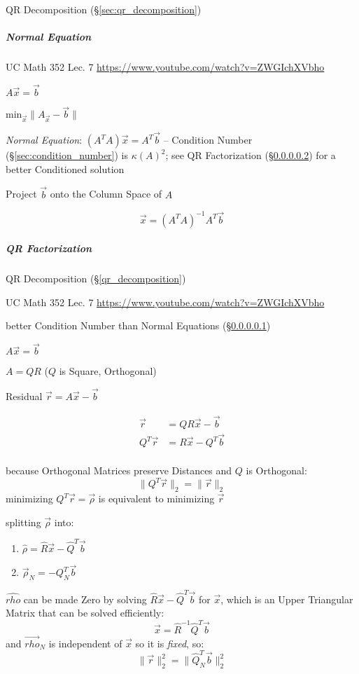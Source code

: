 QR Decomposition (\S\ref{sec:qr_decomposition})



\subparagraph{Normal Equation}\label{sec:normal_equation}\hfill

UC Math 352 Lec. 7 \url{https://www.youtube.com/watch?v=ZWGIchXVbho}

$A\vec{x} = \vec{b}$

$\mathrm{min}_\vec{x} \|A_\vec{x} - \vec{b}\|$

\emph{Normal Equation}: $(A^TA)\vec{x} = A^T\vec{b}$ -- Condition Number
(\S\ref{sec:condition_number}) is $\kappa(A)^2$; see QR Factorization
(\S\ref{sec:qr_factorization}) for a better Conditioned solution

Project $\vec{b}$ onto the Column Space of $A$

\[
  \vec{x} = (A^TA)^{-1}A^T\vec{b}
\]



\subparagraph{QR Factorization}\label{sec:qr_factorization}\hfill

QR Decomposition (\S\ref{qr_decomposition})

UC Math 352 Lec. 7 \url{https://www.youtube.com/watch?v=ZWGIchXVbho}

better Condition Number than Normal Equations (\S\ref{sec:normal_equation})

$A\vec{x} = \vec{b}$

$A = QR$ ($Q$ is Square, Orthogonal)

Residual $\vec{r} = A\vec{x} - \vec{b}$

\begin{align*}
     \vec{r} & = QR\vec{x} - \vec{b} \\
  Q^T\vec{r} & = R\vec{x} - Q^T\vec{b} \\
\end{align*}

because Orthogonal Matrices preserve Distances and $Q$ is Orthogonal:
\[
  \|Q^T\vec{r}\|_2 = \|\vec{r}\|_2
\]
minimizing $Q^T\vec{r} = \vec{\rho}$ is equivalent to minimizing $\vec{r}$

splitting $\vec{\rho}$ into:
\begin{enumerate}
  \item $\hat{\rho}   = \hat{R}\vec{x} - \hat{Q}^T\vec{b}$
  \item $\vec{\rho}_N = -Q_N^T\vec{b}$
\end{enumerate}
$\hat{rho}$ can be made Zero by solving $\hat{R}\vec{x} - \hat{Q}^T\vec{b}$ for
$\vec{x}$, which is an Upper Triangular Matrix that can be solved efficiently:
\[
  \vec{x} = \hat{R}^{-1}\hat{Q}^T\vec{b}
\]
and $\vec{rho}_N$ is independent of $\vec{x}$ so it is \emph{fixed}, so:
\[
  \|\vec{r}\|^2_2 = \|\hat{Q}_N^T\vec{b}\|_2^2
\]



